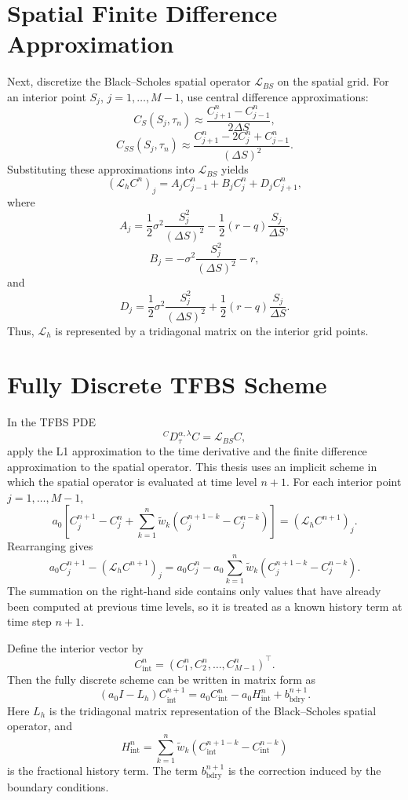 \documentclass[11pt,a4paper]{report}
\begin{document}
\section{Spatial Finite Difference Approximation}

Next, discretize the Black--Scholes spatial operator $\mathcal{L}_{BS}$ on the spatial grid. For an interior point $S_j$, $j=1,\dots,M-1$, use central difference approximations:
\[
C_S(S_j,\tau_n)
\approx
\frac{C_{j+1}^n-C_{j-1}^n}{2\Delta S},
\]
\[
C_{SS}(S_j,\tau_n)
\approx
\frac{C_{j+1}^n-2C_j^n+C_{j-1}^n}{(\Delta S)^2}.
\]
Substituting these approximations into $\mathcal{L}_{BS}$ yields
\[
(\mathcal{L}_h C^n)_j
=
A_j C_{j-1}^n
+
B_j C_j^n
+
D_j C_{j+1}^n,
\]
where
\[
A_j
=
\frac{1}{2}\sigma^2\frac{S_j^2}{(\Delta S)^2}
-
\frac{1}{2}(r-q)\frac{S_j}{\Delta S},
\]
\[
B_j
=
-\sigma^2\frac{S_j^2}{(\Delta S)^2}
-
r,
\]
and
\[
D_j
=
\frac{1}{2}\sigma^2\frac{S_j^2}{(\Delta S)^2}
+
\frac{1}{2}(r-q)\frac{S_j}{\Delta S}.
\]
Thus, $\mathcal{L}_h$ is represented by a tridiagonal matrix on the interior grid points.

\section{Fully Discrete TFBS Scheme}

In the TFBS PDE
\[
{}^C D_\tau^{\alpha,\lambda}C
=
\mathcal{L}_{BS}C,
\]
apply the L1 approximation to the time derivative and the finite difference approximation to the spatial operator. This thesis uses an implicit scheme in which the spatial operator is evaluated at time level $n+1$. For each interior point $j=1,\dots,M-1$,
\[
a_0
\left[
C_j^{n+1}-C_j^n
+
\sum_{k=1}^{n}
\widetilde w_k
\left(
C_j^{n+1-k}-C_j^{n-k}
\right)
\right]
=
(\mathcal{L}_h C^{n+1})_j.
\]
Rearranging gives
\[
a_0 C_j^{n+1}
-
(\mathcal{L}_h C^{n+1})_j
=
a_0 C_j^n
-
a_0
\sum_{k=1}^{n}
\widetilde w_k
\left(
C_j^{n+1-k}-C_j^{n-k}
\right).
\]
The summation on the right-hand side contains only values that have already been computed at previous time levels, so it is treated as a known history term at time step $n+1$.

Define the interior vector by
\[
C_{\mathrm{int}}^n
=
(C_1^n,C_2^n,\dots,C_{M-1}^n)^\top.
\]
Then the fully discrete scheme can be written in matrix form as
\[
(a_0 I - L_h)C_{\mathrm{int}}^{n+1}
=
a_0 C_{\mathrm{int}}^n
-
a_0 H_{\mathrm{int}}^n
+
b_{\mathrm{bdry}}^{n+1}.
\]
Here $L_h$ is the tridiagonal matrix representation of the Black--Scholes spatial operator, and
\[
H_{\mathrm{int}}^n
=
\sum_{k=1}^{n}
\widetilde w_k
\left(
C_{\mathrm{int}}^{n+1-k}
-
C_{\mathrm{int}}^{n-k}
\right)
\]
is the fractional history term. The term $b_{\mathrm{bdry}}^{n+1}$ is the correction induced by the boundary conditions.
\end{document}

